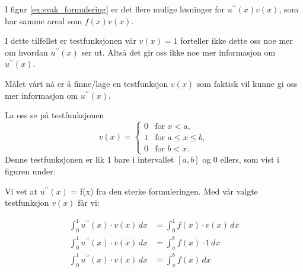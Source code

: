 I figur \ref{ex:svak_formulering} er det flere mulige løsninger for $u^{\prime\prime}(x)v(x)$, som har samme areal som $f(x)v(x)$.

I dette tilfellet er testfunksjonen vår $v(x) = 1$ forteller ikke dette oss noe mer om hvordan $u^{\prime\prime}(x)$ ser ut.
Altså det gir oss ikke noe mer informasjon om $u^{\prime\prime}(x)$.

Målet vårt nå er å finne/lage en testfunksjon $v(x)$ som faktisk vil kunne gi oss mer informasjon om $u^{\prime\prime}(x)$.

La oss se på testfunksjonen
\[
  v(x) =
  \begin{cases}
    0 & \text{for } x < a,           \\
    1 & \text{for } a \leq x \leq b, \\
    0 & \text{for } b < x.
  \end{cases}
\]
Denne testfunksjonen er lik $1$ bare i intervallet $[a,b]$ og $0$ ellers, som vist i figuren under.



Vi vet at $u^{\prime\prime}(x)$ = f(x) fra den sterke formuleringen. Med vår valgte testfunksjon $v(x)$ får vi:

\begin{align*}
  \int_0^1 u^{\prime\prime}(x) \cdot v(x) \, dx &= \int_0^1 f(x) \cdot v(x) \, dx \\
  \int_0^1 u^{\prime\prime}(x) \cdot v(x) \, dx &= \int_a^b f(x) \cdot 1 \, dx \\
  \int_0^1 u^{\prime\prime}(x) \cdot v(x) \, dx &= \int_a^b f(x) \, dx
\end{align*}

